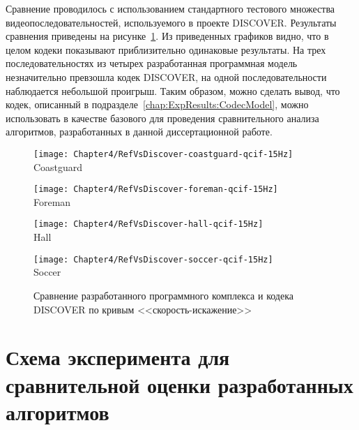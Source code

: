 Сравнение проводилось с использованием стандартного тестового множества видеопоследовательностей, используемого в проекте DISCOVER. Результаты сравнения приведены на рисунке~\ref{fig:CompareReferenceWithDiscover}. Из приведенных графиков видно, что в целом кодеки показывают приблизительно одинаковые результаты. На трех последовательностях из четырех разработанная программная модель незначительно превзошла кодек DISCOVER, на одной последовательности наблюдается небольшой проигрыш. Таким образом, можно сделать вывод, что кодек, описанный в подразделе~\ref{chap:ExpResults:CodecModel}, можно использовать в качестве базового для проведения сравнительного анализа алгоритмов, разработанных в данной диссертационной работе.

\begin{figure}[t]
    \begin{center}
        \begin{minipage}{0.45\textwidth}
            \centering\texttt{[image: Chapter4/RefVsDiscover-coastguard-qcif-15Hz]} \\ Coastguard
        \end{minipage}
        \begin{minipage}{0.45\textwidth}
            \centering\texttt{[image: Chapter4/RefVsDiscover-foreman-qcif-15Hz]} \\ Foreman
        \end{minipage}
        \bigskip 
        \begin{minipage}{0.45\textwidth}
            \centering\texttt{[image: Chapter4/RefVsDiscover-hall-qcif-15Hz]} \\ Hall
        \end{minipage}
        \begin{minipage}{0.45\textwidth}
            \centering\texttt{[image: Chapter4/RefVsDiscover-soccer-qcif-15Hz]} \\ Soccer
        \end{minipage}
    \end{center}
    \caption{Сравнение разработанного программного комплекса и кодека DISCOVER по кривым <<скорость-искажение>>}
    \label{fig:CompareReferenceWithDiscover}
\end{figure}

\section{Схема эксперимента для сравнительной оценки разработанных алгоритмов}
\label{chap:ExpResults:SchemeofExperiment}

